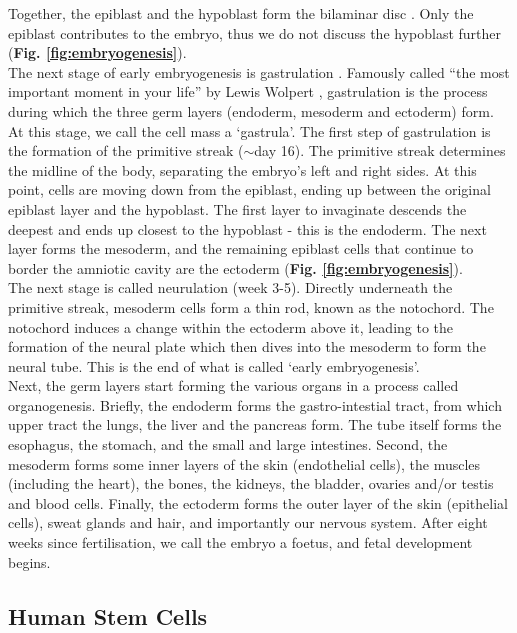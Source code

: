 Together, the epiblast and the hypoblast form the bilaminar disc \cite{hertig1956description}.
Only the epiblast contributes to the embryo, thus we do not discuss the hypoblast further (\textbf{Fig. \ref{fig:embryogenesis}}).\\

The next stage of early embryogenesis is gastrulation \cite{sheng2015epiblast}.
Famously called “the most important moment in your life” by Lewis Wolpert \cite{wolpert2015interview}, gastrulation is the process during which the three germ layers (endoderm, mesoderm and ectoderm) form.
At this stage, we call the cell mass a `gastrula'.
The first step of gastrulation is the formation of the primitive streak ($\sim$day 16).
The primitive streak determines the midline of the body, separating the embryo's left and right sides.
At this point, cells are moving down from the epiblast, ending up between the original epiblast layer and the hypoblast.
The first layer to invaginate descends the deepest and ends up closest to the hypoblast - this is the endoderm.
The next layer forms the mesoderm, and the remaining epiblast cells that continue to border the amniotic cavity are the ectoderm (\textbf{Fig. \ref{fig:embryogenesis}}).\\

The next stage is called neurulation (week 3-5).
Directly underneath the primitive streak, mesoderm cells form a thin rod, known as the notochord.
The notochord induces a change within the ectoderm above it, leading to the formation of the neural plate which then dives into the mesoderm to form the neural tube.
This is the end of what is called `early embryogenesis'.\\

Next, the germ layers start forming the various organs in a process called organogenesis.
Briefly, the endoderm forms the gastro-intestial tract, from which upper tract the lungs, the liver and the pancreas form. 
The tube itself forms the esophagus, the stomach, and the small and large intestines.
Second, the mesoderm forms some inner layers of the skin (endothelial cells), the muscles (including the heart), the bones, the kidneys, the bladder, ovaries and/or testis and blood cells.
Finally, the ectoderm forms the outer layer of the skin (epithelial cells), sweat glands and hair, and importantly our nervous system.
After eight weeks since fertilisation, we call the embryo a foetus, and fetal development begins.

\subsection{Human Stem Cells}
\label{sec:escs} 

